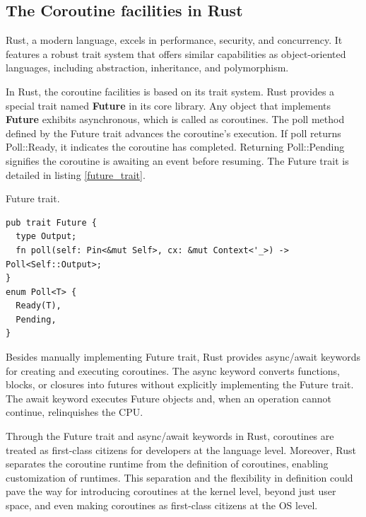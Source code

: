 \documentclass[conference]{IEEEtran}
\begin{document}
\subsection{The Coroutine facilities in Rust}
\label{subsection: rust_async}

Rust, a modern language, excels in performance, security, and concurrency. It features a robust trait system that offers similar capabilities as object-oriented languages, including abstraction, inheritance, and polymorphism.

In Rust, the coroutine facilities is based on its trait system. Rust provides a special trait named \textbf{Future} in its core library. Any object that implements \textbf{Future} exhibits asynchronous, which is called as coroutines. The poll method defined by the Future trait advances the coroutine's execution. If poll returns Poll::Ready, it indicates the coroutine has completed. Returning Poll::Pending signifies the coroutine is awaiting an event before resuming. The Future trait is detailed in listing \ref{future_trait}.

\begin{listing}[tbp]
\caption{Future trait.}
\label{future_trait}
\begin{mdframed}
\begin{verbatim}
pub trait Future {
  type Output;
  fn poll(self: Pin<&mut Self>, cx: &mut Context<'_>) -> Poll<Self::Output>;
}
enum Poll<T> {
  Ready(T),
  Pending,
}
\end{verbatim}
\end{mdframed}
\end{listing}

Besides manually implementing Future trait, Rust provides async/await keywords for creating and executing coroutines. The async keyword converts functions, blocks, or closures into futures without explicitly implementing the Future trait. The await keyword executes Future objects and, when an operation cannot continue, relinquishes the CPU.

Through the Future trait and async/await keywords in Rust, coroutines are treated as first-class citizens for developers at the language level. Moreover, Rust separates the coroutine runtime from the definition of coroutines, enabling customization of runtimes. This separation and the flexibility in definition could pave the way for introducing coroutines at the kernel level, beyond just user space, and even making coroutines as first-class citizens at the OS level.
\end{document}
